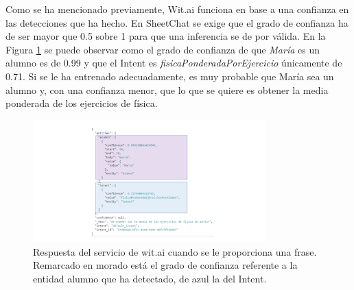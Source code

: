 Como se ha mencionado previamente, Wit.ai funciona en base a una confianza en las detecciones que ha hecho. En SheetChat se exige que el grado de confianza ha de ser mayor que 0.5 sobre 1 para que una inferencia se de por válida. En la Figura \ref{fig:WitaiConfianza} se puede observar como el grado de confianza de que \emph{María} es un alumno es de 0.99 y que el Intent es \emph{fisicaPonderadaPorEjercicio} únicamente de 0.71. Si se le ha entrenado adecuadamente, es muy probable que María sea un alumno y, con una confianza menor, que lo que se quiere es obtener la media ponderada de los ejercicios de física.

\begin{figure}[htb]
	\centering
	\includegraphics[width=0.8\textwidth]{./figs/WitaiConfianza.png}
	\caption{Respuesta del servicio de wit.ai cuando se le proporciona una frase. Remarcado en morado está el grado de confianza referente a la entidad alumno que ha detectado, de azul la del Intent.}
	\label{fig:WitaiConfianza}
\end{figure}






























